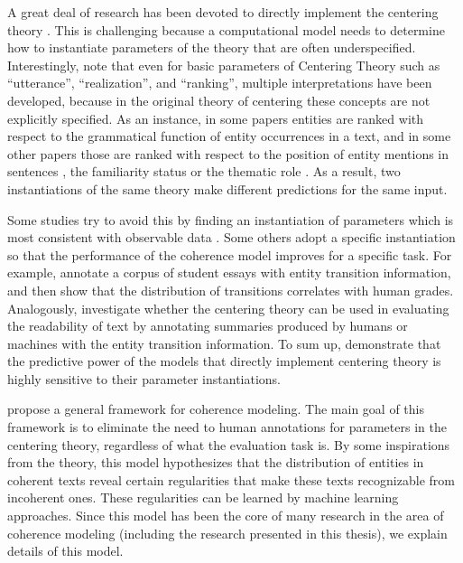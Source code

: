 A great deal of research has been devoted to directly implement the centering theory \cite{miltsakaki00,karamanis04a}. 
This is challenging because a computational model needs to determine how to instantiate parameters of the theory that are often underspecified. 
Interestingly,  note that even for basic parameters of Centering Theory such as ``utterance'', ``realization'', and ``ranking'', multiple interpretations have been developed, because in the original theory of centering these concepts are not explicitly specified. 
As an instance, in some papers entities are ranked with respect to the grammatical function \cite{brennan87,grosz95} of entity occurrences in a text, and in some other papers those are ranked with respect to the position of entity mentions in sentences \cite{prince81a}, the familiarity status or the thematic role \cite{strube.cl99,moens08}.
As a result, two instantiations of the same theory make different predictions for the same input.  

Some studies try to avoid this by finding an instantiation of parameters which is most consistent with observable data \cite{strube.cl99,karamanis04a,poesio04b}. 
Some others adopt a specific instantiation so that the performance of the coherence model improves for a specific task. 
For example,  annotate a corpus of student essays with entity transition information, and then show that the distribution of transitions correlates with human grades. 
Analogously,  investigate whether the centering theory can be used in evaluating the readability of text by annotating summaries produced by humans or machines with the entity transition information. 
To sum up,  demonstrate that the predictive power of the models that directly implement centering theory is highly sensitive to their parameter instantiations.  

 propose a general framework for coherence modeling.  
The main goal of this framework is to eliminate the need to human annotations for parameters in the centering theory, regardless of what the evaluation task is. 
By some inspirations from the theory, this model hypothesizes that the distribution of entities in coherent texts reveal certain regularities that make these texts recognizable from incoherent ones. 
These regularities can be learned by machine learning approaches.  
Since this model has been the core of many research in the area of coherence modeling (including the research presented in this thesis), we explain details of this model.    

